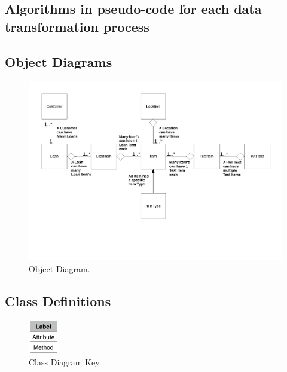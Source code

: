 \subsection{Algorithms in pseudo-code for each data transformation process}

\begin{landscape}

    \subsection{Object Diagrams}

    \begin{figure}[H]
        \begin{center}
        \includegraphics[width=500px]{./Design/Object_Diagrams/Object_diagrams.pdf}
        \caption{Object Diagram.} \label{fig:object_diagram}
        \end{center}
    \end{figure}

\newpage

\subsection{Class Definitions}

    \begin{figure}[H]
        \centerline{\includegraphics[width=50px]{./Design/Class_Definitions/Class_definition_key.pdf}}
        \caption{Class Diagram Key.} \label{fig:relationship_diagram}
    \end{figure}


\end{landscape}
